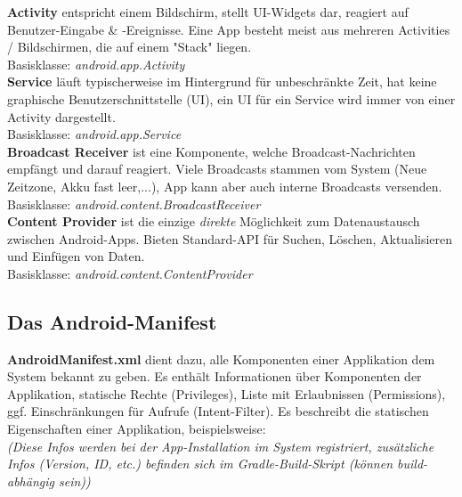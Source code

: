 \documentclass[a4paper]{article}
\begin{document}
	\noindent
	\textbf{Activity} entspricht einem Bildschirm, stellt UI-Widgets dar, reagiert auf Benutzer-Eingabe \& -Ereignisse. Eine App besteht meist aus mehreren Activities / Bildschirmen, die auf einem "Stack" liegen. \\
	Basisklasse: \textit{android.app.Activity} \\
	\textbf{Service} läuft typischerweise im Hintergrund für unbeschränkte Zeit, hat keine graphische Benutzer\-schnittstelle (UI), ein UI für ein Service wird immer von einer Activity dargestellt. \\
	Basisklasse: \textit{android.app.Service} \\
	\textbf{Broadcast Receiver} ist eine Komponente, welche Broadcast-Nachrichten empfängt und darauf reagiert. Viele Broadcasts stammen vom System (Neue Zeitzone, Akku fast leer,...), App kann aber auch interne Broadcasts versenden. \\
	Basisklasse: \textit{android.content.BroadcastReceiver}\\
	\textbf{Content Provider} ist die einzige \textit{direkte} Möglichkeit zum Datenaustausch zwischen Android-Apps. Bieten Standard-API für Suchen, Löschen, Aktualisieren und Einfügen von Daten. \\
	Basisklasse: \textit{android.content.ContentProvider}
	
	\newpage
	\subsection{Das Android-Manifest}
	\textbf{AndroidManifest.xml} dient dazu, alle Komponenten einer Applikation dem System bekannt zu geben. Es enthält Informationen über Komponenten der Applikation, statische Rechte (Privileges), Liste mit Erlaubnissen (Permissions), ggf. Einschränkungen für Aufrufe (Intent-Filter). Es beschreibt die statischen Eigenschaften einer Applikation, beispielsweise: \\
	\textit{(Diese Infos werden bei der App-Installation im System registriert, zusätzliche Infos (Version, ID, etc.) befinden sich im Gradle-Build-Skript (können build-abhängig sein))}
	
\end{document}
